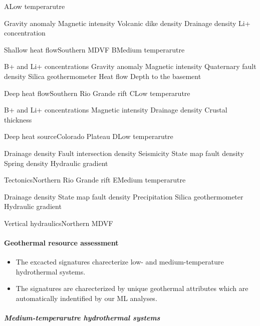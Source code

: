 \documentclass[11pt]{article}
\providecommand{\tightlist}{%
      \setlength{\itemsep}{0pt}\setlength{\parskip}{0pt}}
\begin{document}
\textbar A\textbar Low temperarutre\textbar{}

Gravity anomaly Magnetic intensity Volcanic dike density Drainage
density Li+ concentration

\textbar Shallow heat flow\textbar Southern MDVF\textbar{}
\textbar B\textbar Medium temperarutre\textbar{}

B+ and Li+ concentrations Gravity anomaly Magnetic intensity Quaternary
fault density Silica geothermometer Heat flow Depth to the basement

\textbar Deep heat flow\textbar Southern Rio Grande rift\textbar{}
\textbar C\textbar Low temperarutre\textbar{}

B+ and Li+ concentrations Magnetic intensity Drainage density Crustal
thickness

\textbar Deep heat source\textbar Colorado Plateau\textbar{}
\textbar D\textbar Low temperarutre\textbar{}

Drainage density Fault intersection density Seismicity State map fault
density Spring density Hydraulic gradient

\textbar Tectonics\textbar Northern Rio Grande rift \textbar{}
\textbar E\textbar Medium temperarutre\textbar{}

Drainage density State map fault density Precipitation Silica
geothermometer Hydraulic gradient

\textbar Vertical hydraulics\textbar Northern MDVF\textbar{}

    \hypertarget{geothermal-resource-assessment}{%
\paragraph{Geothermal resource
assessment}\label{geothermal-resource-assessment}}

\begin{itemize}
\tightlist
\item
  The excacted signatures charecterize low- and medium-temperature
  hydrothermal systems.
\item
  The signatures are charecterized by unique geothermal attributes which
  are automatically indentified by our ML analyses.
\end{itemize}

\hypertarget{medium-temperarutre-hydrothermal-systems}{%
\subparagraph{Medium-temperarutre hydrothermal
systems}\label{medium-temperarutre-hydrothermal-systems}}
\end{document}
